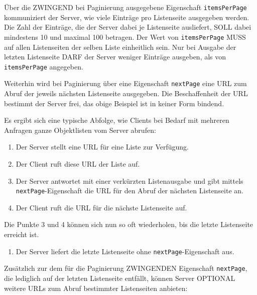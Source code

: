 \documentclass[,a4paper]{article}
\begin{document}
Über die ZWINGEND bei Paginierung ausgegebene Eigenschaft
\texttt{itemsPerPage} kommuniziert der Server, wie viele Einträge pro
Listenseite ausgegeben werden. Die Zahl der Einträge, die der Server
dabei je Listenseite ausliefert, SOLL dabei mindestens 10 und maximal
100 betragen. Der Wert von \texttt{itemsPerPage} MUSS auf allen
Listenseiten der selben Liste einheitlich sein. Nur bei Ausgabe der
letzten Listenseite DARF der Server weniger Einträge ausgeben, als von
\texttt{itemsPerPage} angegeben.

Weiterhin wird bei Paginierung über eine Eigenschaft \texttt{nextPage}
eine URL zum Abruf der jeweils nächsten Listenseite ausgegeben. Die
Beschaffenheit der URL bestimmt der Server frei, das obige Beispiel ist
in keiner Form bindend.

Es ergibt sich eine typische Abfolge, wie Clients bei Bedarf mit
mehreren Anfragen ganze Objektlisten vom Server abrufen:

\begin{enumerate}
\def\labelenumi{\arabic{enumi}.}
\item
  Der Server stellt eine URL für eine Liste zur Verfügung.
\item
  Der Client ruft diese URL der Liste auf.
\item
  Der Server antwortet mit einer verkürzten Listenausgabe und gibt
  mittels \texttt{nextPage}-Eigenschaft die URL für den Abruf der
  nächsten Listenseite an.
\item
  Der Client ruft die URL für die nächste Listenseite auf.
\end{enumerate}

Die Punkte 3 und 4 können sich nun so oft wiederholen, bis die letzte
Listenseite erreicht ist.

\begin{enumerate}
\def\labelenumi{\arabic{enumi}.}
\setcounter{enumi}{4}
\itemsep1pt\parskip0pt
\item
  Der Server liefert die letzte Listenseite ohne
  \texttt{nextPage}-Eigenschaft aus.
\end{enumerate}

Zusätzlich zur dem für die Paginierung ZWINGENDEN Eigenschaft
\texttt{nextPage}, die lediglich auf der letzten Listenseite entfällt,
können Server OPTIONAL weitere URLs zum Abruf bestimmter Listenseiten
anbieten:
\end{document}
